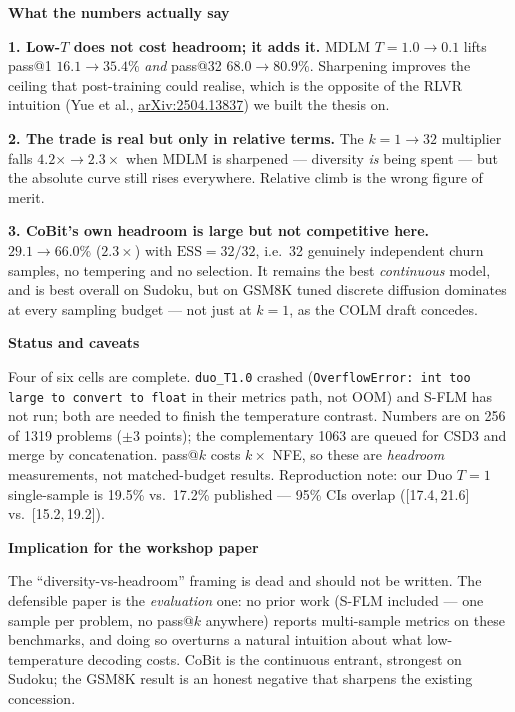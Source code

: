 \documentclass[10pt,a4paper]{article}
\begin{document}
\vspace{-4pt}
{\large\bfseries What the numbers actually say}

\textbf{1. Low-$T$ does not cost headroom; it adds it.} MDLM $T{=}1.0\!\to\!0.1$ lifts pass@1
$16.1\!\to\!35.4\%$ \emph{and} pass@32 $68.0\!\to\!80.9\%$. Sharpening improves the ceiling that
post-training could realise, which is the opposite of the RLVR intuition
(Yue et al., \href{https://arxiv.org/abs/2504.13837}{arXiv:2504.13837}) we built the thesis on.

\textbf{2. The trade is real but only in relative terms.} The $k{=}1\!\to\!32$ multiplier falls
$4.2\times \to 2.3\times$ when MDLM is sharpened --- diversity \emph{is} being spent --- but the
absolute curve still rises everywhere. Relative climb is the wrong figure of merit.

\textbf{3. CoBit's own headroom is large but not competitive here.} $29.1\!\to\!66.0\%$
($2.3\times$) with $\mathrm{ESS}{=}32/32$, i.e.\ 32 genuinely independent churn samples,
no tempering and no selection. It remains the best \emph{continuous} model, and is best overall
on Sudoku, but on GSM8K tuned discrete diffusion dominates at every sampling budget --- not just
at $k{=}1$, as the COLM draft concedes.

\vspace{2pt}
{\large\bfseries Status and caveats}

Four of six cells are complete. \texttt{duo\_T1.0} crashed
(\texttt{OverflowError: int too large to convert to float} in their metrics path, not OOM) and
S-FLM has not run; both are needed to finish the temperature contrast.
Numbers are on 256 of 1319 problems ($\pm$3 points); the complementary 1063 are queued for CSD3
and merge by concatenation. pass@$k$ costs $k\times$ NFE, so these are \emph{headroom}
measurements, not matched-budget results. Reproduction note: our Duo $T{=}1$ single-sample is
19.5\% vs.\ 17.2\% published --- 95\% CIs overlap ([17.4,\,21.6] vs.\ [15.2,\,19.2]).

\vspace{2pt}
{\large\bfseries Implication for the workshop paper}

The ``diversity-vs-headroom'' framing is dead and should not be written. The defensible paper is
the \emph{evaluation} one: no prior work (S-FLM included --- one sample per problem, no pass@$k$
anywhere) reports multi-sample metrics on these benchmarks, and doing so overturns a natural
intuition about what low-temperature decoding costs. CoBit is the continuous entrant, strongest
on Sudoku; the GSM8K result is an honest negative that sharpens the existing concession.
\end{document}
